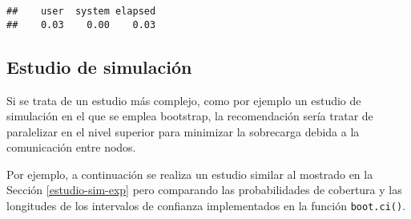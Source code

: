 \documentclass[
]{book}
\theoremstyle{break}
\theoremstyle{definition}
\theoremstyle{definition}
\theoremstyle{definition}
\theoremstyle{definition}
\theoremstyle{remark}
\begin{document}
\begin{verbatim}
##    user  system elapsed 
##    0.03    0.00    0.03
\end{verbatim}

\hypertarget{estudio-sim-boot}{%
\subsection{Estudio de simulación}\label{estudio-sim-boot}}

Si se trata de un estudio más complejo, como por ejemplo un estudio de simulación
en el que se emplea bootstrap, la recomendación sería tratar de paralelizar
en el nivel superior para minimizar la sobrecarga debida a la comunicación
entre nodos.

Por ejemplo, a continuación se realiza un estudio similar al mostrado en la Sección \ref{estudio-sim-exp}
pero comparando las probabilidades de cobertura y las longitudes de los
intervalos de confianza implementados en la función \texttt{boot.ci()}.
\end{document}
